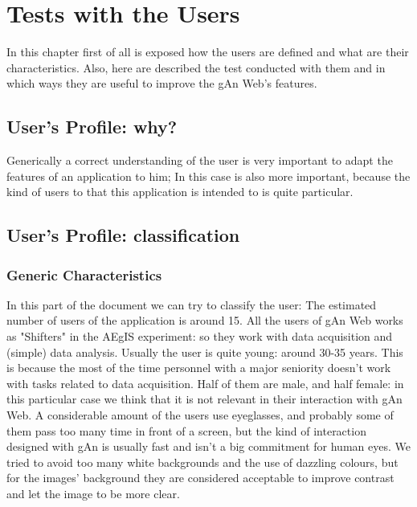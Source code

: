 
\chapter{Tests with the Users} %

\label{Chapter9} %

In this chapter first of all is exposed how the users are defined and what are their characteristics. Also, here are described the test conducted with them and in which ways they are useful to improve the gAn Web's features.   

\section{User's Profile: why?}

Generically a correct understanding of the user is very important to adapt the features of an application to him; In this case is also more important, because the kind of users to that this application is intended to is quite particular.


\section{User's Profile: classification}

\subsection{Generic Characteristics}
In this part of the document we can try to classify the user:
The estimated number of users of the application is around 15.
All the users of gAn Web works as "Shifters" in the AEgIS experiment: so they work with data acquisition and (simple) data analysis.
Usually the user is quite young: around 30-35 years. This is because the most of the time personnel with a major seniority doesn't work with tasks related to data acquisition. 
Half of them are male, and half female: in this particular case we think that it is not relevant in their interaction with gAn Web.
A considerable amount of the users use eyeglasses, and probably some of them pass too many time in front of a screen, but the kind of interaction designed with gAn is usually fast and isn't a big commitment for human eyes. We tried to avoid too many white backgrounds and the use of dazzling colours, but for the images' background they are considered acceptable to improve contrast and let the image to be more clear.  

